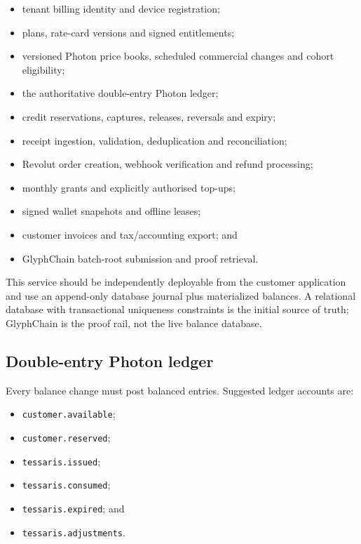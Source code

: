 \documentclass[11pt]{article}
\newcommand{\code}[1]{\texttt{#1}}
\begin{document}
\begin{itemize}
  \item tenant billing identity and device registration;
  \item plans, rate-card versions and signed entitlements;
  \item versioned Photon price books, scheduled commercial changes and cohort eligibility;
  \item the authoritative double-entry Photon ledger;
  \item credit reservations, captures, releases, reversals and expiry;
  \item receipt ingestion, validation, deduplication and reconciliation;
  \item Revolut order creation, webhook verification and refund processing;
  \item monthly grants and explicitly authorised top-ups;
  \item signed wallet snapshots and offline leases;
  \item customer invoices and tax/accounting export; and
  \item GlyphChain batch-root submission and proof retrieval.
\end{itemize}

This service should be independently deployable from the customer application and use an append-only database journal plus materialized balances. A relational database with transactional uniqueness constraints is the initial source of truth; GlyphChain is the proof rail, not the live balance database.

\subsection{Double-entry Photon ledger}

Every balance change must post balanced entries. Suggested ledger accounts are:

\begin{itemize}
  \item \code{customer.available};
  \item \code{customer.reserved};
  \item \code{tessaris.issued};
  \item \code{tessaris.consumed};
  \item \code{tessaris.expired}; and
  \item \code{tessaris.adjustments}.
\end{itemize}
\end{document}
